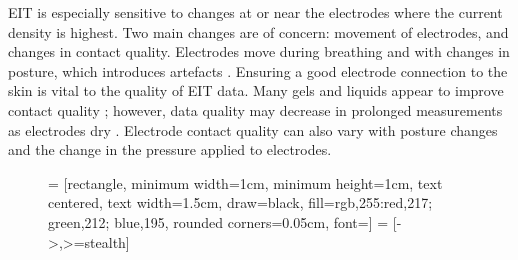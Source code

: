 \documentclass[10pt,journal]{IEEEtran}\def\TBLWIDA{15mm}\def\TBLWIDB{60mm}
\begin{document}
EIT is especially sensitive to changes at or near the electrodes
where the current density is highest. Two main changes are of
concern: movement of electrodes, and changes in contact quality.
Electrodes move during breathing and with changes in posture,
which introduces artefacts \cite{Adler1996Expansion}.
Ensuring a good electrode connection to the skin is vital to 
the quality of EIT data. Many gels and liquids appear to
improve contact quality \cite{Waldmann2017Interface};
however, data quality may decrease in prolonged measurements 
as electrodes dry \cite{Lozano1995Prolonged}.
Electrode contact quality can also vary with
posture changes \cite{Coulombe2005Parametric} and the change in the
pressure applied to electrodes.


\begin{figure}[h]
    = [rectangle, minimum width=1cm, minimum height=1cm,
                      text centered, text width=1.5cm, draw=black, fill={rgb,255:red,217; green,212; blue,195},
   						 rounded corners=0.05cm,
                      font={\footnotesize\sffamily}]
    = [->,>=stealth]
	\centering


\end{figure}
\end{document}
